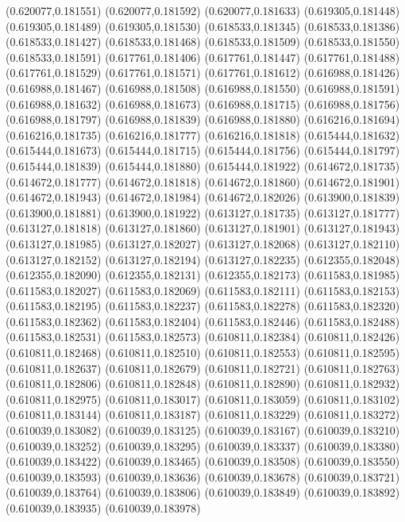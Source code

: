 (0.620077,0.181551)
(0.620077,0.181592)
(0.620077,0.181633)
(0.619305,0.181448)
(0.619305,0.181489)
(0.619305,0.181530)
(0.618533,0.181345)
(0.618533,0.181386)
(0.618533,0.181427)
(0.618533,0.181468)
(0.618533,0.181509)
(0.618533,0.181550)
(0.618533,0.181591)
(0.617761,0.181406)
(0.617761,0.181447)
(0.617761,0.181488)
(0.617761,0.181529)
(0.617761,0.181571)
(0.617761,0.181612)
(0.616988,0.181426)
(0.616988,0.181467)
(0.616988,0.181508)
(0.616988,0.181550)
(0.616988,0.181591)
(0.616988,0.181632)
(0.616988,0.181673)
(0.616988,0.181715)
(0.616988,0.181756)
(0.616988,0.181797)
(0.616988,0.181839)
(0.616988,0.181880)
(0.616216,0.181694)
(0.616216,0.181735)
(0.616216,0.181777)
(0.616216,0.181818)
(0.615444,0.181632)
(0.615444,0.181673)
(0.615444,0.181715)
(0.615444,0.181756)
(0.615444,0.181797)
(0.615444,0.181839)
(0.615444,0.181880)
(0.615444,0.181922)
(0.614672,0.181735)
(0.614672,0.181777)
(0.614672,0.181818)
(0.614672,0.181860)
(0.614672,0.181901)
(0.614672,0.181943)
(0.614672,0.181984)
(0.614672,0.182026)
(0.613900,0.181839)
(0.613900,0.181881)
(0.613900,0.181922)
(0.613127,0.181735)
(0.613127,0.181777)
(0.613127,0.181818)
(0.613127,0.181860)
(0.613127,0.181901)
(0.613127,0.181943)
(0.613127,0.181985)
(0.613127,0.182027)
(0.613127,0.182068)
(0.613127,0.182110)
(0.613127,0.182152)
(0.613127,0.182194)
(0.613127,0.182235)
(0.612355,0.182048)
(0.612355,0.182090)
(0.612355,0.182131)
(0.612355,0.182173)
(0.611583,0.181985)
(0.611583,0.182027)
(0.611583,0.182069)
(0.611583,0.182111)
(0.611583,0.182153)
(0.611583,0.182195)
(0.611583,0.182237)
(0.611583,0.182278)
(0.611583,0.182320)
(0.611583,0.182362)
(0.611583,0.182404)
(0.611583,0.182446)
(0.611583,0.182488)
(0.611583,0.182531)
(0.611583,0.182573)
(0.610811,0.182384)
(0.610811,0.182426)
(0.610811,0.182468)
(0.610811,0.182510)
(0.610811,0.182553)
(0.610811,0.182595)
(0.610811,0.182637)
(0.610811,0.182679)
(0.610811,0.182721)
(0.610811,0.182763)
(0.610811,0.182806)
(0.610811,0.182848)
(0.610811,0.182890)
(0.610811,0.182932)
(0.610811,0.182975)
(0.610811,0.183017)
(0.610811,0.183059)
(0.610811,0.183102)
(0.610811,0.183144)
(0.610811,0.183187)
(0.610811,0.183229)
(0.610811,0.183272)
(0.610039,0.183082)
(0.610039,0.183125)
(0.610039,0.183167)
(0.610039,0.183210)
(0.610039,0.183252)
(0.610039,0.183295)
(0.610039,0.183337)
(0.610039,0.183380)
(0.610039,0.183422)
(0.610039,0.183465)
(0.610039,0.183508)
(0.610039,0.183550)
(0.610039,0.183593)
(0.610039,0.183636)
(0.610039,0.183678)
(0.610039,0.183721)
(0.610039,0.183764)
(0.610039,0.183806)
(0.610039,0.183849)
(0.610039,0.183892)
(0.610039,0.183935)
(0.610039,0.183978)
